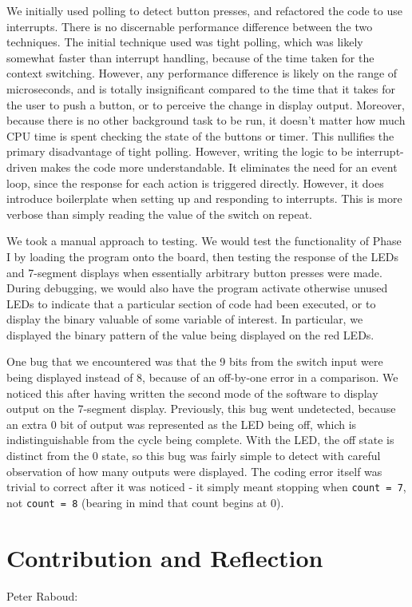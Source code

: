 \documentclass[12pt]{article}
\begin{document}
We initially used polling to detect button presses, and refactored the code
to use interrupts.
There is no discernable performance difference between the two techniques.
The initial technique used was tight polling, which was likely somewhat
faster than interrupt handling, because of the time taken for the context
switching.
However, any performance difference is likely on the range of microseconds,
and is totally insignificant compared to the time that it takes for the
user to push a button, or to perceive the change in display output.
Moreover, because there is no other background task to be run, it doesn't
matter how much CPU time is spent checking the state of the buttons or
timer.
This nullifies the primary disadvantage of tight polling.
However, writing the logic to be interrupt-driven makes the code more
understandable.
It eliminates the need for an event loop, since the response for each
action is triggered directly.
However, it does introduce boilerplate when setting up
and responding to interrupts.
This is more verbose than simply reading the value of the switch on repeat.

We took a manual approach to testing.
We would test the functionality of Phase I by loading the program onto the
board, then testing the response of the LEDs and 7-segment displays when
essentially arbitrary button presses were made.
During debugging, we would also have the program activate otherwise unused
LEDs to indicate that a particular section of code had been executed, or to
display the binary valuable of some variable of interest.
In particular, we displayed the binary pattern of the value being displayed
on the red LEDs.

One bug that we encountered was that the 9 bits from the switch input were
being displayed instead of 8, because of an off-by-one error in a comparison.
We noticed this after having written the second mode of the software to display
output on the 7-segment display.
Previously, this bug went undetected, because an extra 0 bit of output was
represented as the LED being off, which is indistinguishable from the cycle
being complete.
With the LED, the off state is distinct from the 0 state, so this bug was
fairly simple to detect with careful observation of how many outputs
were displayed.
The coding error itself was trivial to correct after it was noticed - it
simply meant stopping when \texttt{count = 7}, not \texttt{count = 8}
(bearing in mind that count begins at 0).

\section{Contribution and Reflection}
Peter Raboud:
\end{document}
